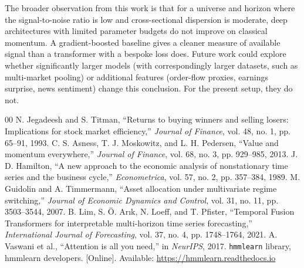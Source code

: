 \documentclass[conference]{IEEEtran}
\begin{document}
The broader observation from this work is that for a universe and horizon where the signal-to-noise ratio is low and cross-sectional dispersion is moderate, deep architectures with limited parameter budgets do not improve on classical momentum. A gradient-boosted baseline gives a cleaner measure of available signal than a transformer with a bespoke loss does. Future work could explore whether significantly larger models (with correspondingly larger datasets, such as multi-market pooling) or additional features (order-flow proxies, earnings surprise, news sentiment) change this conclusion. For the present setup, they do not.

\begin{thebibliography}{00}
 N. Jegadeesh and S. Titman, ``Returns to buying winners and selling losers: Implications for stock market efficiency,'' \textit{Journal of Finance}, vol. 48, no. 1, pp. 65--91, 1993.
 C. S. Asness, T. J. Moskowitz, and L. H. Pedersen, ``Value and momentum everywhere,'' \textit{Journal of Finance}, vol. 68, no. 3, pp. 929--985, 2013.
 J. D. Hamilton, ``A new approach to the economic analysis of nonstationary time series and the business cycle,'' \textit{Econometrica}, vol. 57, no. 2, pp. 357--384, 1989.
 M. Guidolin and A. Timmermann, ``Asset allocation under multivariate regime switching,'' \textit{Journal of Economic Dynamics and Control}, vol. 31, no. 11, pp. 3503--3544, 2007.
 B. Lim, S. \"O. Ar\i k, N. Loeff, and T. Pfister, ``Temporal Fusion Transformers for interpretable multi-horizon time series forecasting,'' \textit{International Journal of Forecasting}, vol. 37, no. 4, pp. 1748--1764, 2021.
 A. Vaswani et al., ``Attention is all you need,'' in \textit{NeurIPS}, 2017.
 \texttt{hmmlearn} library, hmmlearn developers. [Online]. Available: \url{https://hmmlearn.readthedocs.io}
\end{thebibliography}
\end{document}
